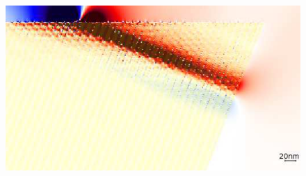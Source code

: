 			\begin{figure}

				\includegraphics[width=\textwidth]{images/multilayer/prism12.png}\\
			\end{figure}
